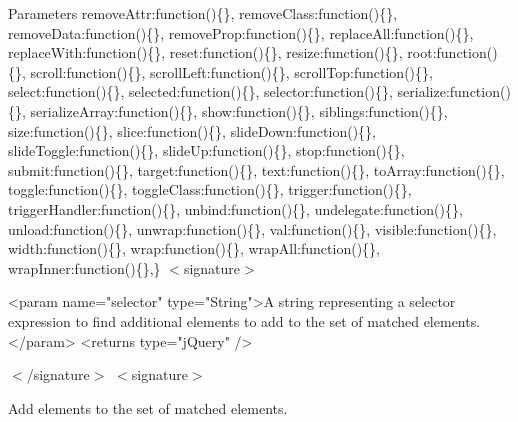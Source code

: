 \begin{DoxyParams}{Parameters}
\textquotesingle{}remove\+Attr\textquotesingle{}\+:function()\{\}, \textquotesingle{}remove\+Class\textquotesingle{}\+:function()\{\}, \textquotesingle{}remove\+Data\textquotesingle{}\+:function()\{\}, \textquotesingle{}remove\+Prop\textquotesingle{}\+:function()\{\}, \textquotesingle{}replace\+All\textquotesingle{}\+:function()\{\}, \textquotesingle{}replace\+With\textquotesingle{}\+:function()\{\}, \textquotesingle{}reset\textquotesingle{}\+:function()\{\}, \textquotesingle{}resize\textquotesingle{}\+:function()\{\}, \textquotesingle{}root\textquotesingle{}\+:function()\{\}, \textquotesingle{}scroll\textquotesingle{}\+:function()\{\}, \textquotesingle{}scroll\+Left\textquotesingle{}\+:function()\{\}, \textquotesingle{}scroll\+Top\textquotesingle{}\+:function()\{\}, \textquotesingle{}select\textquotesingle{}\+:function()\{\}, \textquotesingle{}selected\textquotesingle{}\+:function()\{\}, \textquotesingle{}selector\textquotesingle{}\+:function()\{\}, \textquotesingle{}serialize\textquotesingle{}\+:function()\{\}, \textquotesingle{}serialize\+Array\textquotesingle{}\+:function()\{\}, \textquotesingle{}show\textquotesingle{}\+:function()\{\}, \textquotesingle{}siblings\textquotesingle{}\+:function()\{\}, \textquotesingle{}size\textquotesingle{}\+:function()\{\}, \textquotesingle{}slice\textquotesingle{}\+:function()\{\}, \textquotesingle{}slide\+Down\textquotesingle{}\+:function()\{\}, \textquotesingle{}slide\+Toggle\textquotesingle{}\+:function()\{\}, \textquotesingle{}slide\+Up\textquotesingle{}\+:function()\{\}, \textquotesingle{}stop\textquotesingle{}\+:function()\{\}, \textquotesingle{}submit\textquotesingle{}\+:function()\{\}, \textquotesingle{}target\textquotesingle{}\+:function()\{\}, \textquotesingle{}text\textquotesingle{}\+:function()\{\}, \textquotesingle{}to\+Array\textquotesingle{}\+:function()\{\}, \textquotesingle{}toggle\textquotesingle{}\+:function()\{\}, \textquotesingle{}toggle\+Class\textquotesingle{}\+:function()\{\}, \textquotesingle{}trigger\textquotesingle{}\+:function()\{\}, \textquotesingle{}trigger\+Handler\textquotesingle{}\+:function()\{\}, \textquotesingle{}unbind\textquotesingle{}\+:function()\{\}, \textquotesingle{}undelegate\textquotesingle{}\+:function()\{\}, \textquotesingle{}unload\textquotesingle{}\+:function()\{\}, \textquotesingle{}unwrap\textquotesingle{}\+:function()\{\}, \textquotesingle{}val\textquotesingle{}\+:function()\{\}, \textquotesingle{}visible\textquotesingle{}\+:function()\{\}, \textquotesingle{}width\textquotesingle{}\+:function()\{\}, \textquotesingle{}wrap\textquotesingle{}\+:function()\{\}, \textquotesingle{}wrap\+All\textquotesingle{}\+:function()\{\}, \textquotesingle{}wrap\+Inner\textquotesingle{}\+:function()\{\},\} $<$signature$>$ \begin{DoxyVerb}<param name="selector" type="String">A string representing a selector expression to find additional elements to add to the set of matched elements.</param>
<returns type="jQuery" />
\end{DoxyVerb}
 $<$/signature$>$ $<$signature$>$ \\
\hline
\end{DoxyParams}
Add elements to the set of matched elements.


